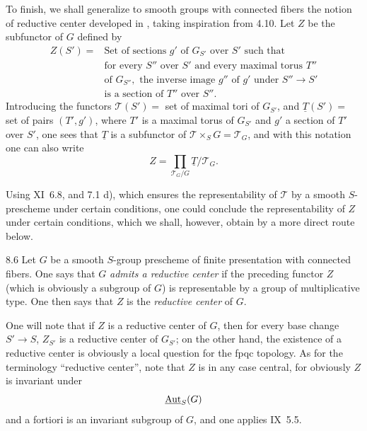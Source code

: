 To finish, we shall generalize to smooth groups with connected fibers the notion of reductive center developed in , taking inspiration from 4.10. Let $Z$ be the subfunctor of $G$ defined by
\[
\begin{aligned}
Z(S')={}&\text{Set of sections }g'\text{ of }G_{S'}\text{ over }S'\text{ such that}\\
&\text{for every }S''\text{ over }S'\text{ and every maximal torus }T''\\
&\text{of }G_{S''},\text{ the inverse image }g''\text{ of }g'\text{ under }S''\to S'\\
&\text{is a section of }T''\text{ over }S''.
\end{aligned}
\]
Introducing the functors $\mathscr T(S')=$ set of maximal tori of $G_{S'}$, and $\underline T(S')=$ set of pairs $(T',g')$, where $T'$ is a maximal torus of $G_{S'}$ and $g'$ a section of $T'$ over $S'$, one sees that $\underline T$ is a subfunctor of $\mathscr T\times_S G=\mathscr T_G$, and with this notation one can also write
\[
Z=\prod_{\mathscr T_G/G}\underline T/\mathscr T_G.
\]

Using XI~6.8, and 7.1 d), which ensures the representability of $\mathscr T$ by a smooth $S$-prescheme under certain conditions, one could conclude the representability of $Z$ under certain conditions, which we shall, however, obtain by a more direct route below.
\begin{definition}{8.6}\label{XII.8.6}
Let $G$ be a smooth $S$-group prescheme of finite presentation with connected fibers. One says that $G$ \emph{admits a reductive center} if the preceding functor $Z$ (which is obviously a subgroup of $G$) is representable by a group of multiplicative type. One then says that $Z$ is the \emph{reductive center} of $G$.
\end{definition}
One will note that if $Z$ is a reductive center of $G$, then for every base change $S'\to S$, $Z_{S'}$ is a reductive center of $G_{S'}$; on the other hand, the existence of a reductive center is obviously a local question for the fpqc topology. As for the terminology ``reductive center'', note that $Z$ is in any case central, for obviously $Z$ is invariant under
\[
\underline{\operatorname{Aut}}_S(G)
\]
and a fortiori is an invariant subgroup of $G$, and one applies IX~5.5.

